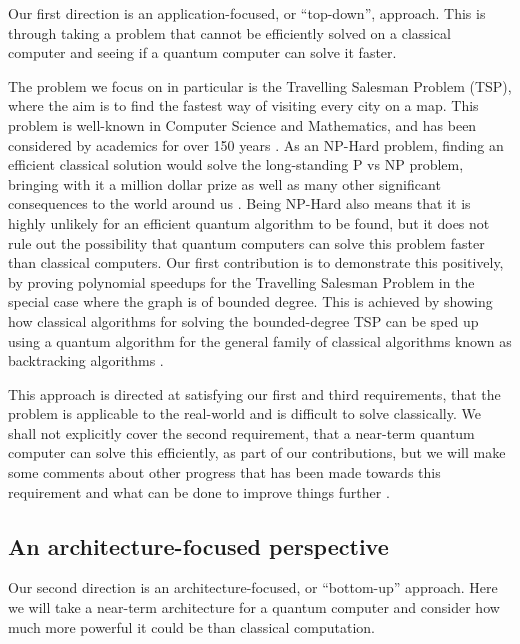 Our first direction is an application-focused, or ``top-down'', approach. This is through taking a problem that cannot be efficiently solved on a classical computer and seeing if a quantum computer can solve it faster.

The problem we focus on in particular is the Travelling Salesman Problem (TSP), where the aim is to find the fastest way of visiting every city on a map. This problem is well-known in Computer Science and Mathematics, and has been considered by academics for over 150 years \cite{schrijver2005}. As an NP-Hard problem, finding an efficient classical solution would solve the long-standing P vs NP problem, bringing with it a million dollar prize as well as many other significant consequences to the world around us \cite{cmipvsnp, aaronson2006}. Being NP-Hard also means that it is highly unlikely for an efficient quantum algorithm to be found, but it does not rule out the possibility that quantum computers can solve this problem faster than classical computers. Our first contribution is to demonstrate this positively, by proving polynomial speedups for the Travelling Salesman Problem in the special case where the graph is of bounded degree. This is achieved by showing how classical algorithms for solving the bounded-degree TSP \cite{eppstein2007, xiao2016degree3, xiao2016degree4} can be sped up using a quantum algorithm for the general family of classical algorithms known as backtracking algorithms \cite{montanaro2015}.

This approach is directed at satisfying our first and third requirements, that the problem is applicable to the real-world and is difficult to solve classically. We shall not explicitly cover the second requirement, that a near-term quantum computer can solve this efficiently, as part of our contributions, but we will make some comments about other progress that has been made towards this requirement and what can be done to improve things further \cite{dunjko2018, ge2019}.

\subsection{An architecture-focused perspective}

Our second direction is an architecture-focused, or ``bottom-up'' approach. Here we will take a near-term architecture for a quantum computer and consider how much more powerful it could be than classical computation.

